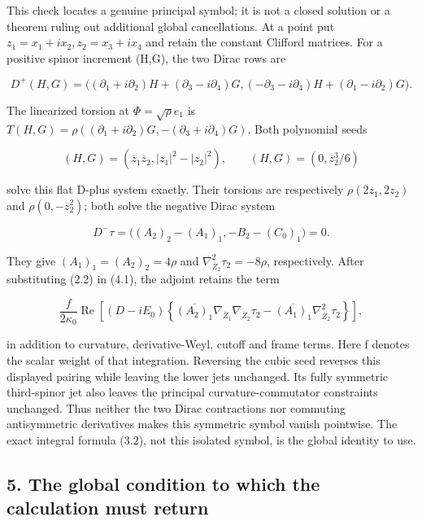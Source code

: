 \documentclass[
  10pt,
]{article}
\begin{document}
This check locates a genuine principal symbol; it is not a closed
solution or a theorem ruling out additional global cancellations. At a
point put \(z_1=x_1+ix_2,z_2=x_3+ix_4\) and retain the constant Clifford
matrices. For a positive spinor increment (H,G), the two Dirac rows are

\[
 D^+(H,G)=\bigl((\partial_1+i\partial_2)H+
                   (\partial_3-i\partial_4)G,
       (-\partial_3-i\partial_4)H+(\partial_1-i\partial_2)G\bigr).
\]

The linearized torsion at \(\Phi=\sqrt\rho e_1\) is
\(T(H,G)=\rho((\partial_1+i\partial_2)G,  - (\partial_3+i\partial_4)G)\).
Both polynomial seeds

\[
 (H,G)=(\overline z_1\overline z_2,|z_1|^2-|z_2|^2),
 \qquad (H,G)=(0,\overline z_2^3/6)
\]

solve this flat D-plus system exactly. Their torsions are respectively
\(\rho(2z_1,2z_2)\) and \(\rho(0,-\overline z_2^2)\); both solve the
negative Dirac system

\[
 D^-\tau=\bigl((A_2)_2-(A_1)_1,-B_2-(C_0)_1\bigr)=0.
\]

They give \((A_1)_1=(A_2)_2=4\rho\) and
\(\nabla_{\overline Z_2}^2\tau_2=-8\rho\), respectively. After
substituting (2.2) in (4.1), the adjoint retains the term

\[
 \frac{f}{2\kappa_0}\operatorname{Re}\left[(D-iE_0)
 \left\{\overline{(A_2)_1}\nabla_{\overline Z_1}
                          \nabla_{\overline Z_2}\tau_2
       -\overline{(A_1)_1}\nabla_{\overline Z_2}^2\tau_2\right\}\right],
\]

in addition to curvature, derivative-Weyl, cutoff and frame terms. Here
f denotes the scalar weight of that integration. Reversing the cubic
seed reverses this displayed pairing while leaving the lower jets
unchanged. Its fully symmetric third-spinor jet also leaves the
principal curvature-commutator constraints unchanged. Thus neither the
two Dirac contractions nor commuting antisymmetric derivatives makes
this symmetric symbol vanish pointwise. The exact integral formula
(3.2), not this isolated symbol, is the global identity to use.

\hypertarget{the-global-condition-to-which-the-calculation-must-return}{%
\subsection{5. The global condition to which the calculation must
return}\label{the-global-condition-to-which-the-calculation-must-return}}
\end{document}

